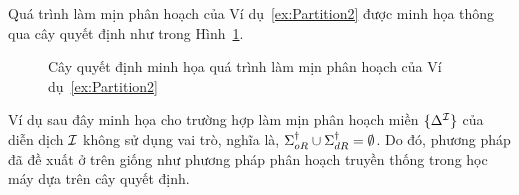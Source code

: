 Quá trình làm mịn phân hoạch của Ví dụ~\ref{ex:Partition2} được minh họa thông qua cây quyết định như trong Hình~\ref{fig:DecisionTree2}.

\begin{figure}[h!]
\caption{Cây quyết định minh họa quá trình làm mịn phân hoạch của Ví dụ~\ref{ex:Partition2}\label{fig:DecisionTree2}}
\end{figure}

Ví dụ sau đây minh họa cho trường hợp làm mịn phân hoạch miền $\{\Delta^{\mathcal{I}}\}$ của diễn dịch $\mathcal{I}$ không sử dụng vai trò, nghĩa là, $\Sigma^\dag_{oR} \cup \Sigma^\dag_{dR} = \emptyset$. Do đó, phương pháp đã đề xuất ở trên giống như phương pháp phân hoạch truyền thống trong học máy dựa trên cây quyết định.

